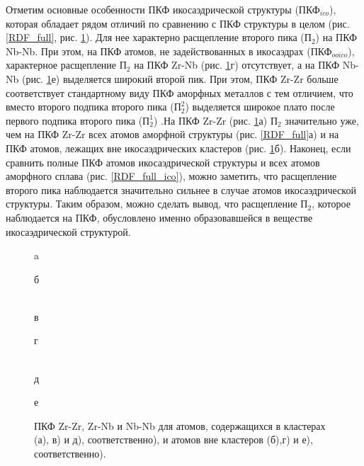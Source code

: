 Отметим основные особенности ПКФ  икосаэдрической структуры ($\text{ПКФ}_{ico}$), которая обладает рядом отличий по сравнению с ПКФ структуры в целом (рис. \ref{RDF_full}, рис. \ref{RDF_ico_besico}). Для нее характерно  расщепление второго пика ($\text{П}_2$) на ПКФ Nb-Nb.  При этом, на ПКФ атомов, не задействованных в икосаэдрах ($\text{ПКФ}_{ooico}$),  характерное расщепление $\text{П}_2$ на ПКФ Zr-Nb (рис. \ref{RDF_ico_besico}г) отсутствует, а на ПКФ Nb-Nb (рис. \ref{RDF_ico_besico}е)   выделяется широкий второй пик. При этом,  ПКФ Zr-Zr больше соответствует стандартному виду ПКФ аморфных металлов с тем  отличием, что вместо второго подпика второго пика ($\text{П}_2^2$)  выделяется широкое плато после первого подпика второго пика ($\text{П}_2^1$) .На ПКФ Zr-Zr (рис. \ref{RDF_ico_besico}а) $\text{П}_2$ значительно уже, чем на ПКФ Zr-Zr всех атомов аморфной структуры (рис. \ref{RDF_full}а) и на ПКФ атомов, лежащих вне икосаэдрических кластеров (рис. \ref{RDF_ico_besico}б). Наконец, если сравнить полные ПКФ атомов икосаэдрической структуры и всех атомов аморфного сплава (рис. \ref{RDF_full_ico}), можно заметить, что расщепление второго пика наблюдается значительно сильнее в случае атомов икосаэдрической структуры. Таким образом, можно сделать вывод, что расщепление $\text{П}_2$, которое наблюдается  на ПКФ, обусловлено именно образовавшейся в веществе икосаэдрической структурой. 
\begin{figure}[h!]
	\begin{minipage}[h!]{0.47\linewidth}
		 a \\
	\end{minipage}
	\hfill
	\begin{minipage}[h!]{0.47\linewidth}
		 б \\
	\end{minipage}
	\vfill
	\begin{minipage}[h!]{0.47\linewidth}
		 \\в
	\end{minipage}
	\hfill
	\begin{minipage}[h!]{0.47\linewidth}
		 г \\
	\end{minipage}
	\vfill
	\begin{minipage}[h!]{0.47\linewidth}
		 \\д
	\end{minipage}
	\hfill
	\begin{minipage}[h!]{0.47\linewidth}
		 е \\
	\end{minipage}
	\caption{ПКФ Zr-Zr, Zr-Nb и Nb-Nb для атомов, содержащихся в кластерах (а), в) и д), соответственно), и атомов вне кластеров (б),г) и е), соответственно).}
	\label{RDF_ico_besico}
\end{figure}

